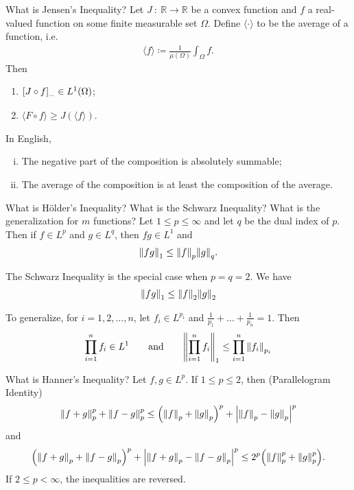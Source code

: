 \documentclass[avery5388,grid,frame]{flashcards}
\newcommand{\f}[3]{#1\ :\ #2 \rightarrow #3}
\def\Rl{\mathbb{R}}
\begin{document}
\begin{flashcard}
    {What is Jensen's Inequality?}
    Let $\f{J}{\Rl}{\Rl}$ be a convex function and $f$ a real-valued function on some finite measurable set $\Omega$.  Define $\langle\cdot\rangle$ to be the average of a function, i.e.
    \begin{align*}
        \langle f \rangle \coloneqq \frac{1}{\mu(\Omega)}\int_\Omega f.
    \end{align*}
    Then
    \begin{enumerate}[ (i)]
        \item $\qty[J \circ f]_- \in L^1(\Omega)$;
        \item $\langle F \circ f \rangle \geq J(\langle f \rangle)$.
    \end{enumerate}
    In English,
    \begin{enumerate}[(i)]
        \item The negative part of the composition is absolutely summable;
        \item The average of the composition is at least the composition of the average.
    \end{enumerate}
\end{flashcard}

\begin{flashcard}
    {What is H\"{o}lder's Inequality?  What is the Schwarz Inequality?  What is the generalization for $m$ functions?}
    Let $1\leq p\leq\infty$ and let $q$ be the dual index of $p$.  Then if $f \in L^p$ and $g \in L^q$, then $fg \in L^1$ and
    \begin{align*}
        \norm{fg}_1 \leq \norm{f}_p\norm{g}_q.
    \end{align*}

    The Schwarz Inequality is the special case when $p = q = 2$.  We have
    \begin{align*}
        \norm{fg}_1 \leq \norm{f}_2\norm{g}_2
    \end{align*}

    To generalize, for $i = 1, 2, \dots, n$, let $f_i \in L^{p_i}$ and $\displaystyle\frac{1}{p_1} + \dots + \frac{1}{p_n} = 1$.  Then
    \begin{align*}
        \prod_{i=1}^n f_i \in L^1 \qquad \text{and} \qquad \norm{\prod_{i=1}^n f_i}_1 \leq \prod_{i=1}^n\norm{f_i}_{p_i}
    \end{align*}
\end{flashcard}

\begin{flashcard}
    {What is Hanner's Inequality?}
    Let $f,g \in L^p$.  If $1 \leq p \leq 2$, then (Parallelogram Identity)
    \begin{align*}
        \norm{f + g}_p^p + \norm{f - g}_p^p \leq \qty(\norm{f}_p + \norm{g}_p)^p + \abs{\norm{f}_p - \norm{g}_p}^p
    \end{align*}
    and
    \begin{align*}
        \qty(\norm{f + g}_p + \norm{f - g}_p)^p + \abs{\norm{f + g}_p - \norm{f - g}_p}^p \leq 2^p\qty(\norm{f}_p^p + \norm{g}_p^p).
    \end{align*}
    If $2 \leq p < \infty$, the inequalities are reversed.  
\end{flashcard}
\end{document}

